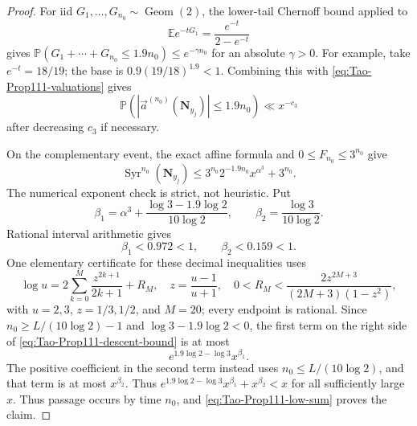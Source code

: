 \begin{proof}
For iid \(G_1,\ldots,G_{n_0}\sim\operatorname{Geom}(2)\), the lower-tail
Chernoff bound applied to
\[
 \mathbb E e^{-tG_1}=\frac{e^{-t}}{2-e^{-t}}
\]
gives
\(\mathbb P(G_1+\cdots+G_{n_0}\le1.9n_0)\le e^{-\gamma n_0}\)
for an absolute \(\gamma>0\).  For example, take
\(e^{-t}=18/19\); the base is
\(0.9(19/18)^{1.9}<1\).  Combining this with
\eqref{eq:Tao-Prop111-valuations} gives
\begin{equation}
\label{eq:Tao-Prop111-low-sum}
 \mathbb P\!\left(
  |\vec a^{(n_0)}(\mathbf N_{y_j})|\le1.9n_0
 \right)\ll x^{-c_3}
\end{equation}
after decreasing \(c_3\) if necessary.

On the complementary event, the exact affine formula and
\(0\le F_{n_0}\le3^{n_0}\) give
\begin{equation}
\label{eq:Tao-Prop111-descent-bound}
 \operatorname{Syr}^{n_0}(\mathbf N_{y_j})
 \le 3^{n_0}2^{-1.9n_0}x^{\alpha^3}+3^{n_0}.
\end{equation}
The numerical exponent check is strict, not heuristic.  Put
\[
 \beta_1=\alpha^3+
  \frac{\log3-1.9\log2}{10\log2},
 \qquad
 \beta_2=\frac{\log3}{10\log2}.
\]
Rational interval arithmetic gives
\begin{equation}
\label{eq:Tao-Prop111-exponents}
 \beta_1<0.972<1,
 \qquad \beta_2<0.159<1.
\end{equation}
One elementary certificate for these decimal inequalities uses
\[
 \log u=2\sum_{k=0}^{M}\frac{z^{2k+1}}{2k+1}+R_M,
 \quad z=\frac{u-1}{u+1},
 \quad 0<R_M<\frac{2z^{2M+3}}{(2M+3)(1-z^2)},
\]
with \(u=2,3\), \(z=1/3,1/2\), and \(M=20\); every endpoint is rational.
Since
\(n_0\ge L/(10\log2)-1\) and
\(\log3-1.9\log2<0\), the first term on the right side of
\eqref{eq:Tao-Prop111-descent-bound} is at most
\[
 e^{1.9\log2-\log3}x^{\beta_1}.
\]
The positive coefficient in the second term instead uses
\(n_0\le L/(10\log2)\), and that term is at most \(x^{\beta_2}\).
Thus
\(e^{1.9\log2-\log3}x^{\beta_1}+x^{\beta_2}<x\) for all sufficiently
large \(x\).
Thus passage occurs by time \(n_0\), and
\eqref{eq:Tao-Prop111-low-sum} proves the claim.
\end{proof}

